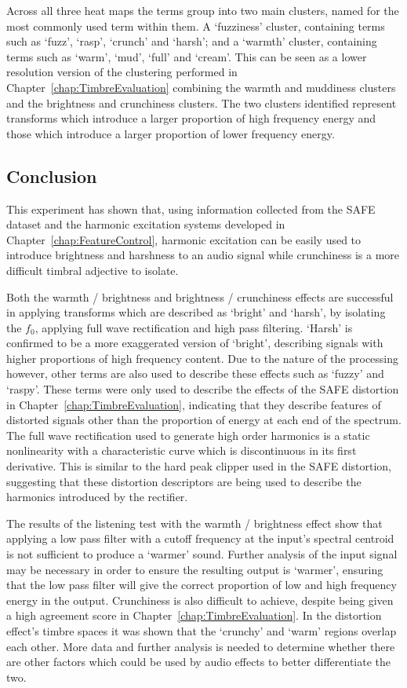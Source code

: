 			Across all three heat maps the terms group into two main clusters, named for the most commonly used
			term within them. A `fuzziness' cluster, containing terms such as `fuzz', `rasp', `crunch' and
			`harsh'; and a `warmth' cluster, containing terms such as `warm', `mud', `full' and `cream'. This
			can be seen as a lower resolution version of the clustering performed in
			Chapter~\ref{chap:TimbreEvaluation} combining the warmth and muddiness clusters and the brightness
			and crunchiness clusters. The two clusters identified represent transforms which introduce a larger
			proportion of high frequency energy and those which introduce a larger proportion of lower
			frequency energy.

	\subsection{Conclusion}
	\label{sec:PerceptualExperiments-SemanticControl-Conclusion}
		This experiment has shown that, using information collected from the SAFE dataset and the harmonic
		excitation systems developed in Chapter~\ref{chap:FeatureControl}, harmonic excitation can be easily used
		to introduce brightness and harshness to an audio signal while crunchiness is a more difficult timbral
		adjective to isolate.

		Both the warmth / brightness and brightness / crunchiness effects are successful in applying transforms
		which are described as `bright' and `harsh', by isolating the $f_{0}$, applying full wave rectification and
		high pass filtering. `Harsh' is confirmed to be a more exaggerated version of `bright', describing signals
		with higher proportions of high frequency content. Due to the nature of the processing however, other terms
		are also used to describe these effects such as `fuzzy' and `raspy'. These terms were only used to describe
		the effects of the SAFE distortion in Chapter~\ref{chap:TimbreEvaluation}, indicating that they describe
		features of distorted signals other than the proportion of energy at each end of the spectrum. The full
		wave rectification used to generate high order harmonics is a static nonlinearity with a characteristic
		curve which is discontinuous in its first derivative. This is similar to the hard peak clipper used in the
		SAFE distortion, suggesting that these distortion descriptors are being used to describe the harmonics
		introduced by the rectifier.

		The results of the listening test with the warmth / brightness effect show that applying a low pass filter
		with a cutoff frequency at the input's spectral centroid is not sufficient to produce a `warmer' sound.
		Further analysis of the input signal may be necessary in order to ensure the resulting output is `warmer',
		ensuring that the low pass filter will give the correct proportion of low and high frequency energy in the
		output. Crunchiness is also difficult to achieve, despite being given a high agreement score in
		Chapter~\ref{chap:TimbreEvaluation}. In the distortion effect's timbre spaces it was shown that the
		`crunchy' and `warm' regions overlap each other. More data and further analysis is needed to determine
		whether there are other factors which could be used by audio effects to better differentiate the two.

